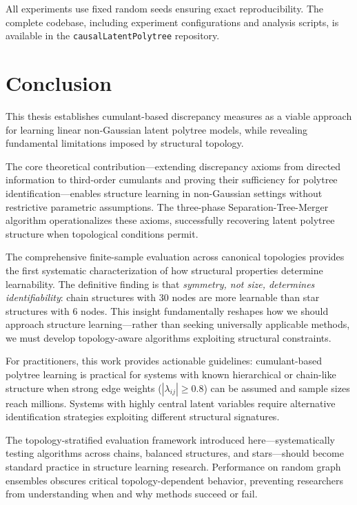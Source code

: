 \documentclass[11pt,a4paper]{article}
\numberwithin{equation}{section}
\begin{document}
All experiments use fixed random seeds ensuring exact reproducibility. The complete codebase, including experiment configurations and analysis scripts, is available in the \texttt{causalLatentPolytree} repository.

\section{Conclusion}
\label{sec:conclusion}

This thesis establishes cumulant-based discrepancy measures as a viable approach for learning linear non-Gaussian latent polytree models, while revealing fundamental limitations imposed by structural topology.

The core theoretical contribution—extending discrepancy axioms from directed information to third-order cumulants and proving their sufficiency for polytree identification—enables structure learning in non-Gaussian settings without restrictive parametric assumptions. The three-phase Separation-Tree-Merger algorithm operationalizes these axioms, successfully recovering latent polytree structure when topological conditions permit.

The comprehensive finite-sample evaluation across canonical topologies provides the first systematic characterization of how structural properties determine learnability. The definitive finding is that \emph{symmetry, not size, determines identifiability}: chain structures with 30 nodes are more learnable than star structures with 6 nodes. This insight fundamentally reshapes how we should approach structure learning—rather than seeking universally applicable methods, we must develop topology-aware algorithms exploiting structural constraints.

For practitioners, this work provides actionable guidelines: cumulant-based polytree learning is practical for systems with known hierarchical or chain-like structure when strong edge weights ($|\lambda_{ij}| \geq 0.8$) can be assumed and sample sizes reach millions. Systems with highly central latent variables require alternative identification strategies exploiting different structural signatures.

The topology-stratified evaluation framework introduced here—systematically testing algorithms across chains, balanced structures, and stars—should become standard practice in structure learning research. Performance on random graph ensembles obscures critical topology-dependent behavior, preventing researchers from understanding when and why methods succeed or fail.
\end{document}
